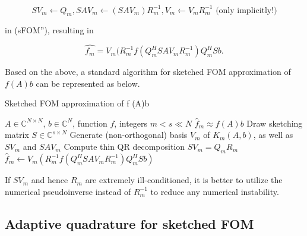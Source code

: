 \[
    SV_m \leftarrow Q_m, SAV_m \leftarrow (SAV_m)R_m^{-1}, V_m \leftarrow V_mR_m^{-1} \text{ (only implicitly!)}
\]

in (sFOM''), resulting in

\[
    \hat{f_m} = V_m(R_m^{-1}f(Q_m^{H}SAV_mR_m^{-1})Q_m^{H}Sb.
    \tag{\footnotesize sFOM'''}
\]

Based on the above, a standard algorithm for sketched FOM approximation of $f(A)b$ can be represented as below.

\begin{algorithm}[H]
    \caption{Sketched FOM approximation of f (A)b \cite{41}}
    \label{alg: Sketched FOM approximation of f (A)b}
    \begin{algorithmic}[1]
        \REQUIRE $A \in \mathbb{C}^{N \times N}$, $b \in \mathbb{C}^{N}$, function $f$, integers $m < s \ll N$
        \ENSURE $\hat{f}_m \approx f(A)b$
        \STATE Draw sketching matrix $S \in \mathbb{C}^{s \times N}$
        \STATE Generate (non-orthogonal) basis $V_m$ of $K_m(A, b)$, as well as $SV_m$ and $SAV_m$
        \STATE Compute thin QR decomposition $SV_m = Q_m R_m$
        \STATE $\hat{f}_m \gets V_m \left(R_m^{-1} f \left(Q_m^H S A V_m R_m^{-1} \right) Q_m^H S b \right)$
    \end{algorithmic}
\end{algorithm}

\begin{remark}
    \label{rem:2.18}
    \cite{41} If $SV_m$ and hence $R_m$ are extremely ill-conditioned, it is better to utilize the numerical pseudoinverse instead of $R_m^{-1}$ to reduce any numerical instability.
\end{remark}

\subsection{Adaptive quadrature for sketched FOM}
\label{sec:adap_sketched_FOM}

